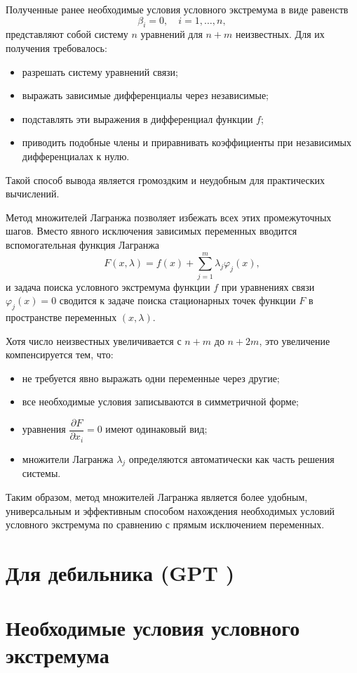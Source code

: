 \documentclass{article}
\begin{document}
Полученные ранее необходимые условия условного экстремума
в виде равенств
\[
\beta_i = 0, \quad i=1,\dots,n,
\]
представляют собой систему $n$ уравнений для $n+m$ неизвестных.
Для их получения требовалось:
\begin{itemize}
    \item разрешать систему уравнений связи;
    \item выражать зависимые дифференциалы через независимые;
    \item подставлять эти выражения в дифференциал функции $f$;
    \item приводить подобные члены и приравнивать коэффициенты при
    независимых дифференциалах к нулю.
\end{itemize}

Такой способ вывода является громоздким и неудобным для практических вычислений.

Метод множителей Лагранжа позволяет избежать всех этих промежуточных шагов.
Вместо явного исключения зависимых переменных вводится вспомогательная функция
Лагранжа
\[
F(x,\lambda) = f(x) + \sum_{j=1}^{m} \lambda_j \varphi_j(x),
\]
и задача поиска условного экстремума функции $f$
при уравнениях связи $\varphi_j(x)=0$
сводится к задаче поиска стационарных точек функции $F$
в пространстве переменных $(x,\lambda)$.

Хотя число неизвестных увеличивается с $n+m$ до $n+2m$,
это увеличение компенсируется тем, что:
\begin{itemize}
    \item не требуется явно выражать одни переменные через другие;
    \item все необходимые условия записываются в симметричной форме;
    \item уравнения $\dfrac{\partial F}{\partial x_i}=0$ имеют одинаковый вид;
    \item множители Лагранжа $\lambda_j$ определяются автоматически
    как часть решения системы.
\end{itemize}

Таким образом, метод множителей Лагранжа является более удобным,
универсальным и эффективным способом нахождения необходимых условий
условного экстремума по сравнению с прямым исключением переменных.



\section{Для дебильника (GPT )}
\section*{Необходимые условия условного экстремума}
\end{document}
